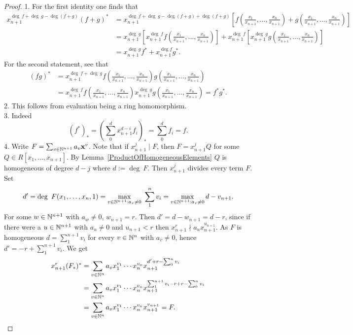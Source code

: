 \begin{proof}
    1. For the first identity one finds that 
    \begin{align*}
        x_{n+1}^{\deg\ f +\deg \ g - \deg( f+g)}(f+g)^\ast &=x_{n+1}^{\deg\ f +\deg \ g - \deg( f+g)+\deg(f+g)}\left[f\left(\frac{x_1}{x_{n+1}},\dots,\frac{x_n}{x_{n+1}}\right) + g\left(\frac{x_1}{x_{n+1}},\dots,\frac{x_n}{x_{n+1}}\right)\right]\\ &= x_{n+1}^{\deg\ g}\left[x_{n+1}^{\deg\ f}f\left(\frac{x_1}{x_{n+1}},\dots,\frac{x_n}{x_{n+1}}\right)\right] + x_{n+1}^{\deg\ f}\left[x_{n+1}^{\deg\ g}g\left(\frac{x_1}{x_{n+1}},\dots,\frac{x_n}{x_{n+1}}\right)\right]\\
        &= x_{n+1}^{\deg\ g}f^\ast+x_{n+1}^{\deg f}g^\ast.
    \end{align*}
    For the second statement, see that
    \begin{align*}
        \left(fg\right)^\ast &= x_{n+1}^{\deg\ f+ \deg \ g} f\left(\frac{x_1}{x_{n+1}},\dots,\frac{x_n}{x_{n+1}}\right)g\left(\frac{x_1}{x_{n+1}},\dots,\frac{x_n}{x_{n+1}}\right)\\  &= x_{n+1}^{\deg \ f}f\left(\frac{x_1}{x_{n+1}},\dots,\frac{x_n}{x_{n+1}}\right)x_{n+1}^{\deg\ g}g\left(\frac{x_1}{x_{n+1}},\dots,\frac{x_n}{x_{n+1}}\right)=f^\ast g^\ast.
    \end{align*}
    2. This follows from evaluation being a ring homomorphism.\\
    3. Indeed
    $$(f^\ast)_\ast = \left(\sum_0^d x_{n+1}^{d-i}f_i\right)_\ast= \sum_0^df_i =f.$$
    4. Write $F=\sum_{v\in\mathbb{N}^{n+1}} a_v\mathbf{x}^v$. Note that if $x_{n+1}^j\mid F$, then $F= x_{n+1}^j Q$ for some $Q\in R[x_1,\dots,x_{n+1}]$. By Lemma~\ref{ProductOfHomogeneousElements} $Q$ is homogeneous of degree $d-j$ where $d := \deg \ F$. Then $x_{n+1}^j$ divides every term $F$. Set 
    $$d' = \deg \ F(x_1,\dots,x_n,1) = \max_{v\in\mathbb{N}^{n+1} : a_v\neq 0}\ \sum_1^n v_i = \max_{v\in\mathbb{N}^{n+1}:a_v\neq0} d-v_{n+1}.$$
    For some $w\in\mathbb{N}^{n+1}$ with $a_w\neq0$, $w_{n+1} = r$. Then $d' = d-w_{n+1}=d-r$, since if there were a $u\in \mathbb{N}^{n+1}$ with $a_u\neq0 $ and $u_{n+1}<r$ then $x_{n+1}^r\nmid a_ux_{n+1}^{u_{n+1}}.$ As $F$ is homogeneous $d = \sum_1^{n+1} v_i$ for every $v\in \mathbb{N}^n$ with $a_v\neq0$, hence $d' = -r+\sum_1^{n+1}v_i$. We get
    \begin{align*}
        x_{n+1}^r(F_\ast)^\ast &= \sum_{v\in \mathbb{N}^{n}} a_v x_1^{v_1}\cdots x_{n}^{v_n}x_{n+1}^{d'+r-\sum_0^n v_i}\\
        &=\sum_{v\in \mathbb{N}^{n}} a_v x_1^{v_1}\cdots x_{n}^{v_n}x_{n+1}^{\sum_1^{n+1}v_i -r+r-\sum_0^n v_i}\\ 
        &= \sum_{v\in \mathbb{N}^{n}} a_v x_1^{v_1}\cdots x_{n}^{v_n}x_{n+1}^{v_{n+1}}=F.
    \end{align*}
\end{proof}
